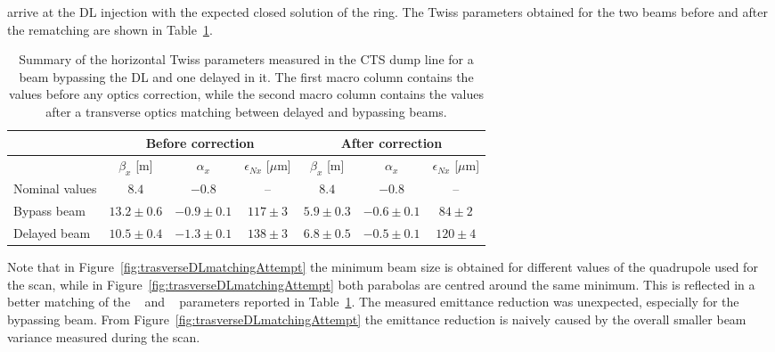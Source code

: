 arrive at the DL injection with the expected closed solution of the ring.
The Twiss parameters obtained for the two beams before and after the rematching are shown in
Table~\ref{tab:quadMatchingDLfirst}.
%
\begin{table}[htbp]
\centering
\begin{tabular}{l c c c | c c c}
\hline
               & \multicolumn{3}{c|}{Before correction}              & \multicolumn{3}{c}{After correction} \\
\hline
                & $\beta_x$  [m]  &  $\alpha_x$     &  $\epsilon_{Nx}$   [$\mu$m]   & $\beta_x$  [m]  &  $\alpha_x$     &  $\epsilon_{Nx}$   [$\mu$m] \\
\hline
Nominal values  & $8.4$           & $-0.8$          & --             & $8.4$       & $-0.8$       & --    \\
Bypass beam     & $13.2 \pm 0.6$  & $-0.9 \pm 0.1$  & $117 \pm 3$    & $5.9 \pm 0.3$   & $-0.6 \pm 0.1$   & $84 \pm 2$ \\
Delayed beam    & $10.5 \pm 0.4$  & $-1.3 \pm 0.1$  & $138 \pm 3$    & $6.8 \pm 0.5$   & $-0.5 \pm 0.1$   & $120 \pm 4$ \\
\hline 
\end{tabular}
\caption{Summary of the horizontal Twiss parameters measured in the CTS dump line for a beam bypassing
         the DL and one delayed in it.
         The first macro column contains the values before any optics correction, while the second
         macro column contains the values after a transverse optics matching between delayed and
         bypassing beams.}
\label{tab:quadMatchingDLfirst}
\end{table}
%
Note that in Figure~\ref{fig:trasverseDLmatchingAttempt}
the minimum beam size is obtained for different values of the quadrupole used for the scan, while in
Figure~\ref{fig:trasverseDLmatchingAttempt} both parabolas
are centred around the same minimum.
This is reflected in a better matching of the \textbeta~ and \textalpha~ parameters reported in
Table~\ref{tab:quadMatchingDLfirst}.
The measured emittance reduction was unexpected, especially for the bypassing beam.
From Figure~\ref{fig:trasverseDLmatchingAttempt} the emittance reduction is naively caused by the
overall smaller beam variance measured during the scan.

